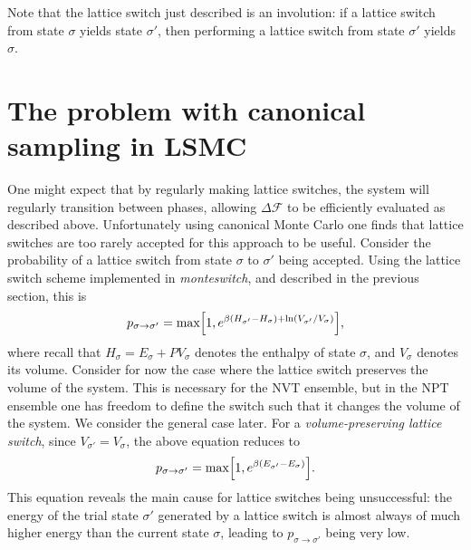 \documentclass{report}
\begin{document}
Note that the lattice switch just described is an involution: if a lattice switch from state $\sigma$ yields state $\sigma'$, then
performing a lattice switch from state $\sigma'$ yields $\sigma$.

\section{The problem with canonical sampling in LSMC}
One might expect that by regularly making lattice switches, the system will regularly transition between phases, allowing $\Delta \mathcal{F}$ to 
be efficiently evaluated as described above. Unfortunately using canonical Monte Carlo one finds that lattice switches are too rarely accepted for 
this approach to be useful. 
%
Consider the probability of a lattice switch from state $\sigma$ to $\sigma'$ being accepted. Using the lattice switch scheme implemented in
\emph{monteswitch}, and described in the previous section, this is
\begin{equation}\label{p_LSMC_NPT}
p_{\sigma\to\sigma'}=\text{max}\Bigl[1,e^{\beta(H_{\sigma'}-H_{\sigma})+\ln(V_{\sigma'}/V_{\sigma})}\Bigr],
\end{equation}
where recall that $H_{\sigma}=E_{\sigma}+PV_{\sigma}$ denotes the enthalpy of state $\sigma$, and $V_{\sigma}$ denotes its volume. Consider for now the
case where the lattice switch preserves the volume of the system. This is necessary for the NVT ensemble, but in the NPT ensemble one has freedom to
define the switch such that it changes the volume of the system. We consider the general case later.
For a \emph{volume-preserving lattice switch}, since $V_{\sigma'}=V_{\sigma}$, the above equation reduces to
\begin{equation}\label{p_LSMC_NVT}
p_{\sigma\to\sigma'}=\text{max}\Bigl[1,e^{\beta(E_{\sigma'}-E_{\sigma})}\Bigr].
\end{equation}
This equation reveals the main cause for lattice switches being unsuccessful: the energy of the trial state $\sigma'$ generated by a 
lattice switch is almost always of much higher energy than the current state $\sigma$, leading to $p_{\sigma\to\sigma'}$ being very low. 
\end{document}
